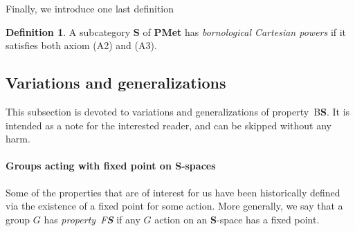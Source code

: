 \documentclass[a4paper]{article}
\theoremstyle{definition}
\newtheorem{defn}[lem]{Definition}
\newtheorem{rem}[lem]{Remark}
\newcommand*{\category}[1]{\textbf{#1}}
\newcommand*{\PMet}{\category{PMet}}
\newcommand*{\CatS}{\category{S}}
\newcommand*{\BS}{B\textbf{S}}
\newcommand*{\FS}{F\textbf{S}}
\begin{document}
Finally, we introduce one last definition
%
%
\begin{defn}
A subcategory \CatS{} of \PMet{} has \emph{bornological Cartesian powers} if it satisfies both axiom (A2) and (A3).
\end{defn}
%
%
%
\subsection{Variations and generalizations}
This subsection is devoted to variations and generalizations of property~\BS.
It is intended as a note for the interested reader, and can be skipped without any harm.
%
%
%
%
%
\paragraph{Groups acting with fixed point on \CatS-spaces}
Some of the properties that are of interest for us have been historically defined via the existence of a fixed point for some action.
More generally, we say that a group $G$ has \emph{property~\FS} if any $G$ action on an \CatS-space has a fixed point.
\end{document}
